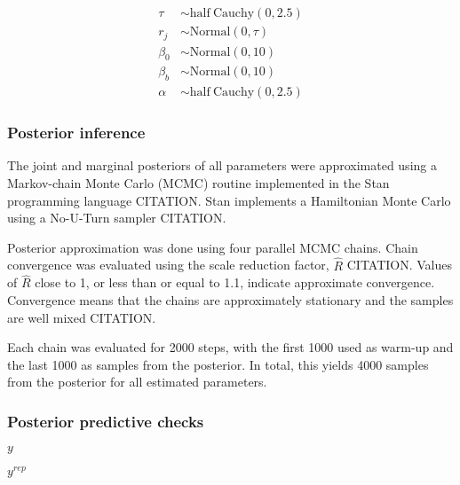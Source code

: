 \documentclass[12pt,letterpaper]{article}
\begin{document}
\begin{align*}
  \tau &\sim \mathrm{half\ Cauchy}(0, 2.5) \\
  r_{j} &\sim \mathrm{Normal}(0, \tau) \\
  \beta_{0} &\sim \mathrm{Normal}(0, 10) \\
  \beta_{b} &\sim \mathrm{Normal}(0, 10) \\
  \alpha &\sim \mathrm{half\ Cauchy}(0, 2.5)
\end{align*}


\subsubsection{Posterior inference}

The joint and marginal posteriors of all parameters were approximated using a Markov-chain Monte Carlo (MCMC) routine implemented in the Stan programming language CITATION. Stan implements a Hamiltonian Monte Carlo using a No-U-Turn sampler CITATION. 

Posterior approximation was done using four parallel MCMC chains. Chain convergence was evaluated using the scale reduction factor, \(\hat{R}\) CITATION. Values of \(\hat{R}\) close to 1, or less than or equal to 1.1, indicate approximate convergence. Convergence means that the chains are approximately stationary and the samples are well mixed CITATION.

Each chain was evaluated for 2000 steps, with the first 1000 used as warm-up and the last 1000 as samples from the posterior. In total, this yields 4000 samples from the posterior for all estimated parameters. 


\subsubsection{Posterior predictive checks}

\(y\)

\(y^{rep}\)
\end{document}

